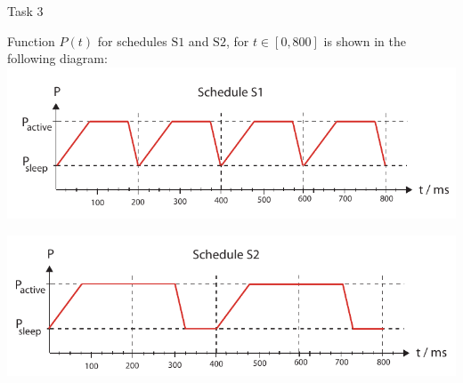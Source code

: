 \begin{frame}[allowframebreaks]{Task 3}{}
  \begin{solutionnoinc}
    Function $P(t)$ for schedules $\mathrm{S} 1$ and $\mathrm{S} 2$, for $t \in[0,800]$ is shown in the following diagram:
    \includegraphics[width=\textwidth]{./figures/task3_2_1.png}
  \end{solutionnoinc}
  \begin{solution}
    \includegraphics[width=\textwidth]{./figures/task3_2_2.png}
  \end{solution}
\end{frame}

